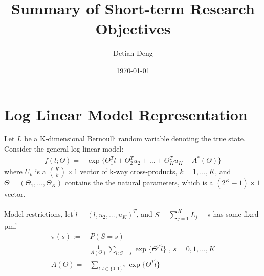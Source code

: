 \documentclass[11 pt, a4paper]{article}  %
\begin{document}
\title{Summary of Short-term Research Objectives}   %
\author{Detian Deng}         %
\date{\today}    %
\maketitle




\section{Log Linear Model Representation}             %
Let $L$ be a K-dimensional Bernoulli random variable denoting the true state.
Consider the general log linear model:
\begin{align*}
f(l; \Theta) = & \exp \{\Theta_1^T l + \Theta_2^{T} u_2 + \ldots + \Theta_K^T u_K - A^*(\Theta)\}
\end{align*}
where $U_k$ is a ${K \choose k} \times 1$ vector of k-way cross-products, $k = 1,\ldots,K$,  and $\Theta = (\Theta_1,\ldots, \Theta_K)$ contains the the natural parameters, which is a $(2^K-1) \times 1$ vector.\\
\ \\
Model restrictions, let $\tilde{l} = (l,u_2,\dots,u_K)^T$, and $S = \sum_{j=1}^K L_j = s$ has some fixed pmf 
\begin{align}
\pi(s) := & P(S=s)\nonumber \\ 
= & \frac{1}{A(\Theta)} \sum_{\tilde{l}:S=s}\exp \{ \Theta^T \tilde{l}\}  \text{ , } s = 0,1,\ldots, K \\
A(\Theta) = & \sum_{\tilde{l}:l\in \{0,1\}^K}\exp \{ \Theta^T \tilde{l}\}
\end{align}
\end{document}
